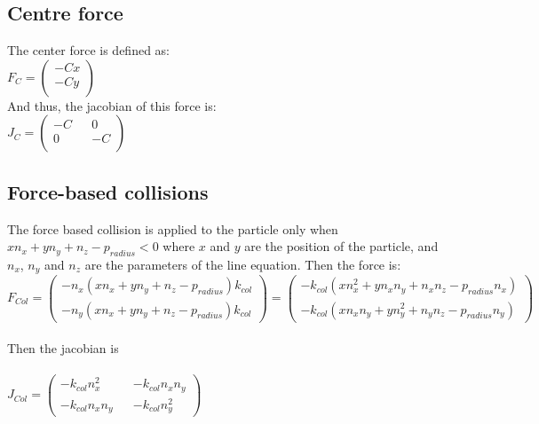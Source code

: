 \documentclass[10pt,a4paper]{report}
\begin{document}
\subsection*{Centre force}
The center force is defined as:\\
$
F_C=\begin{pmatrix}
-Cx\\
-Cy\\
\end{pmatrix}
$\\
And thus, the jacobian of this force is:\\
$
J_C=\begin{pmatrix}
-C && 0\\
0 && -C\\
\end{pmatrix}
$\\
\subsection*{Force-based collisions}
The force based collision is applied to the particle only when\\
$xn_x+yn_y+n_z-p_{radius} < 0$ where $x$ and $y$ are the position of the particle, and $n_x$, $n_y$ and $n_z$ are the parameters of the line equation. Then the force is:\\
$
F_{Col}=\begin{pmatrix}
-n_x(xn_x+yn_y+n_z-p_{radius})k_{col}\\
-n_y(xn_x+yn_y+n_z-p_{radius})k_{col}
\end{pmatrix}
=
\begin{pmatrix}
-k_{col}(xn_x^2+yn_xn_y+n_xn_z-p_{radius}n_x)\\
-k_{col}(xn_xn_y+yn_y^2+n_yn_z-p_{radius}n_y)
\end{pmatrix}
$\\\\
Then the jacobian is\\\\
$
J_{Col}=\begin{pmatrix}
-k_{col}n_x^2 	&& -k_{col}n_xn_y\\
-k_{col}n_xn_y 	&& -k_{col}n_y^2
\end{pmatrix}
$
\end{document}
